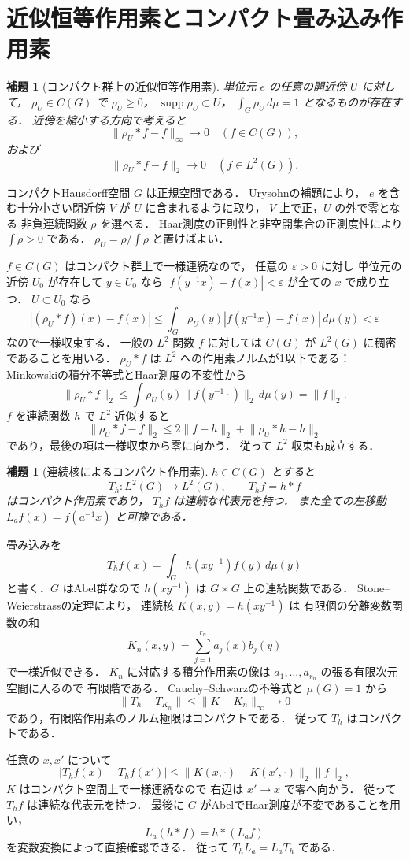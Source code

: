 \documentclass[a5paper,10pt,onecolumn]{jsarticle}
\makeatletter
\theoremstyle{mathnotetheorem}
\newtheorem{lemma}[theorem]{補題}
\renewcommand{\proofname}{証明}
\renewenvironment{proof}[1][\proofname]{%
  \par\pushQED{\qed}\normalfont\topsep4\p@\@plus2\p@\relax
  \trivlist\item[\hskip\labelsep\bfseries #1]\ignorespaces
}{\popQED\endtrivlist\@endpefalse}
\newcommand{\norm}[1]{\lVert #1\rVert}
\makeatother
\begin{document}
\section{近似恒等作用素とコンパクト畳み込み作用素}

\begin{lemma}[コンパクト群上の近似恒等作用素]
\label{lem:approx-id}
単位元 $e$ の任意の開近傍 $U$ に対して，
$\rho_U\in C(G)$ で $\rho_U\ge0$，
$\operatorname{supp}\rho_U\subset U$，
$\int_G\rho_U\,d\mu=1$ となるものが存在する．
近傍を縮小する方向で考えると
\[
 \norm{\rho_U*f-f}_\infty\to0
 \quad(f\in C(G)),
\]
および
\[
 \norm{\rho_U*f-f}_2\to0
 \quad(f\in L^2(G)).
\]
\end{lemma}
\begin{proof}
コンパクトHausdorff空間 $G$ は正規空間である．
Urysohnの補題により，
$e$ を含む十分小さい閉近傍 $V$ が $U$ に含まれるように取り，
$V$ 上で正，$U$ の外で零となる
非負連続関数 $\rho$ を選べる．
Haar測度の正則性と非空開集合の正測度性により
$\int\rho>0$ である．
$\rho_U=\rho/\int\rho$ と置けばよい．

$f\in C(G)$ はコンパクト群上で一様連続なので，
任意の $\varepsilon>0$ に対し
単位元の近傍 $U_0$ が存在して
$y\in U_0$ なら
$|f(y^{-1}x)-f(x)|<\varepsilon$ が全ての $x$ で成り立つ．
$U\subset U_0$ なら
\[
 |(\rho_U*f)(x)-f(x)|
 \le\int_G\rho_U(y)|f(y^{-1}x)-f(x)|\,d\mu(y)
 <\varepsilon
\]
なので一様収束する．
一般の $L^2$ 関数 $f$ に対しては
$C(G)$ が $L^2(G)$ に稠密であることを用いる．
$\rho_U*f$ は $L^2$ への作用素ノルムが1以下である：
Minkowskiの積分不等式とHaar測度の不変性から
\[
 \norm{\rho_U*f}_2
 \le\int\rho_U(y)\norm{f(y^{-1}\cdot)}_2\,d\mu(y)
 =\norm f_2.
\]
$f$ を連続関数 $h$ で $L^2$ 近似すると
\[
 \norm{\rho_U*f-f}_2
 \le2\norm{f-h}_2+\norm{\rho_U*h-h}_2
\]
であり，最後の項は一様収束から零に向かう．
従って $L^2$ 収束も成立する．
\end{proof}

\begin{lemma}[連続核によるコンパクト作用素]
\label{lem:convolution-compact}
$h\in C(G)$ とすると
\[
 T_h:L^2(G)\to L^2(G),\qquad T_hf=h*f
\]
はコンパクト作用素であり，
$T_hf$ は連続な代表元を持つ．
また全ての左移動
$L_af(x)=f(a^{-1}x)$ と可換である．
\end{lemma}
\begin{proof}
畳み込みを
\[
 T_hf(x)=\int_Gh(xy^{-1})f(y)\,d\mu(y)
\]
と書く．$G$ はAbel群なので
$h(xy^{-1})$ は $G\times G$ 上の連続関数である．
Stone--Weierstrassの定理により，
連続核 $K(x,y)=h(xy^{-1})$ は
有限個の分離変数関数の和
\[
 K_n(x,y)=\sum_{j=1}^{r_n}a_j(x)b_j(y)
\]
で一様近似できる．
$K_n$ に対応する積分作用素の像は
$a_1,\dots,a_{r_n}$ の張る有限次元空間に入るので
有限階である．
Cauchy--Schwarzの不等式と $\mu(G)=1$ から
\[
 \norm{T_h-T_{K_n}}\le\norm{K-K_n}_\infty\to0
\]
であり，有限階作用素のノルム極限はコンパクトである．
従って $T_h$ はコンパクトである．

任意の $x,x'$ について
\[
 |T_hf(x)-T_hf(x')|
 \le\norm{K(x,\cdot)-K(x',\cdot)}_2\norm f_2,
\]
$K$ はコンパクト空間上で一様連続なので
右辺は $x'\to x$ で零へ向かう．
従って $T_hf$ は連続な代表元を持つ．
最後に $G$ がAbelでHaar測度が不変であることを用い，
\[
 L_a(h*f)=h*(L_af)
\]
を変数変換によって直接確認できる．
従って $T_hL_a=L_aT_h$ である．
\end{proof}
\end{document}
